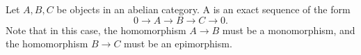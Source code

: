 \documentclass{article}
\begin{document}
Let $A,B,C$ be objects in an abelian category.  A {}
is an exact sequence of the form
$$0 \to A \to B \to C \to 0.$$
Note that in this case,
the homomorphism $A \to B$
must be a monomorphism,
and the homomorphism $B \to C$ 
must be an epimorphism.
\end{document}

